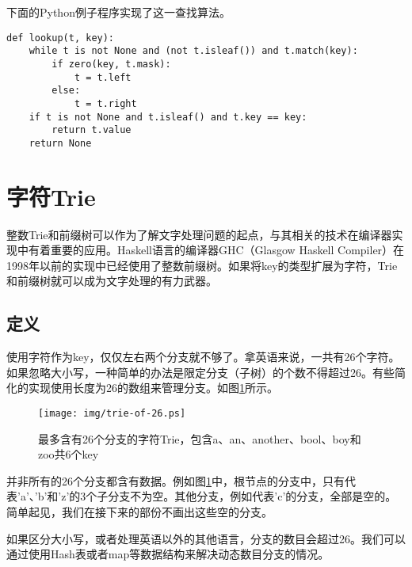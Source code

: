 \documentclass[UTF8]{article}
\begin{document}
下面的Python例子程序实现了这一查找算法。

\lstset{language=Python}
\begin{lstlisting}
def lookup(t, key):
    while t is not None and (not t.isleaf()) and t.match(key):
        if zero(key, t.mask):
            t = t.left
        else:
            t = t.right
    if t is not None and t.isleaf() and t.key == key:
        return t.value
    return None
\end{lstlisting}


\section{字符Trie}

整数Trie和前缀树可以作为了解文字处理问题的起点，与其相关的技术在编译器实现中有着重要的应用。Haskell语言的编译器GHC（Glasgow Haskell Compiler）在1998年以前的实现中已经使用了整数前缀树\cite{okasaki-int-map}。如果将key的类型扩展为字符，Trie和前缀树就可以成为文字处理的有力武器。

\subsection{定义}
使用字符作为key，仅仅左右两个分支就不够了。拿英语来说，一共有26个字符。如果忽略大小写，一种简单的办法是限定分支（子树）的个数不得超过26。有些简化的实现使用长度为26的数组来管理分支。如图\ref{fig:trie-of-26}所示。

\begin{figure}[htbp]
  \centering
  \texttt{[image: img/trie-of-26.ps]}
  \caption{最多含有26个分支的字符Trie，包含a、an、another、bool、boy和zoo共6个key}
  \label{fig:trie-of-26}
\end{figure}

并非所有的26个分支都含有数据。例如图\ref{fig:trie-of-26}中，根节点的分支中，只有代表'a'、'b'和'z'的3个子分支不为空。其他分支，例如代表'c'的分支，全部是空的。简单起见，我们在接下来的部份不画出这些空的分支。

如果区分大小写，或者处理英语以外的其他语言，分支的数目会超过26。我们可以通过使用Hash表或者map等数据结构来解决动态数目分支的情况。
\end{document}

